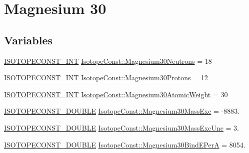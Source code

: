 \hypertarget{group___isotope_const-_magnesium-_mg30}{}\section{Magnesium 30}
\label{group___isotope_const-_magnesium-_mg30}
\subsection*{Variables}
\begin{DoxyCompactItemize}
\item 
\mbox{\hyperlink{group___isotope_const-_macros_ga5f18360b3e99483a35c32d789e62621c}{I\+S\+O\+T\+O\+P\+E\+C\+O\+N\+S\+T\+\_\+\+I\+NT}} \mbox{\hyperlink{group___isotope_const-_magnesium-_mg30_gaa249dd7a4f13c0e3c47f921e2ca0599b}{Isotope\+Const\+::\+Magnesium30\+Neutrons}} = 18
\item 
\mbox{\hyperlink{group___isotope_const-_macros_ga5f18360b3e99483a35c32d789e62621c}{I\+S\+O\+T\+O\+P\+E\+C\+O\+N\+S\+T\+\_\+\+I\+NT}} \mbox{\hyperlink{group___isotope_const-_magnesium-_mg30_gaff3e4c6004c3a483938e3a0d3ea1d7ce}{Isotope\+Const\+::\+Magnesium30\+Protons}} = 12
\item 
\mbox{\hyperlink{group___isotope_const-_macros_ga5f18360b3e99483a35c32d789e62621c}{I\+S\+O\+T\+O\+P\+E\+C\+O\+N\+S\+T\+\_\+\+I\+NT}} \mbox{\hyperlink{group___isotope_const-_magnesium-_mg30_ga05779bf10880d02f1b7fe62829cd8506}{Isotope\+Const\+::\+Magnesium30\+Atomic\+Weight}} = 30
\item 
\mbox{\hyperlink{group___isotope_const-_macros_ga8f45a7272ce02c0b4c65c44636ed719a}{I\+S\+O\+T\+O\+P\+E\+C\+O\+N\+S\+T\+\_\+\+D\+O\+U\+B\+LE}} \mbox{\hyperlink{group___isotope_const-_magnesium-_mg30_gad72d77554cb8829bb114ed812bd0c622}{Isotope\+Const\+::\+Magnesium30\+Mass\+Exc}} = -\/8883.
\item 
\mbox{\hyperlink{group___isotope_const-_macros_ga8f45a7272ce02c0b4c65c44636ed719a}{I\+S\+O\+T\+O\+P\+E\+C\+O\+N\+S\+T\+\_\+\+D\+O\+U\+B\+LE}} \mbox{\hyperlink{group___isotope_const-_magnesium-_mg30_gafbfaaaad42754694a94114f4b08306d4}{Isotope\+Const\+::\+Magnesium30\+Mass\+Exc\+Unc}} = 3.
\item 
\mbox{\hyperlink{group___isotope_const-_macros_ga8f45a7272ce02c0b4c65c44636ed719a}{I\+S\+O\+T\+O\+P\+E\+C\+O\+N\+S\+T\+\_\+\+D\+O\+U\+B\+LE}} \mbox{\hyperlink{group___isotope_const-_magnesium-_mg30_ga06b77c538f0197ec110e41474137d018}{Isotope\+Const\+::\+Magnesium30\+Bind\+E\+PerA}} = 8054.
\item 

\end{DoxyCompactItemize}
